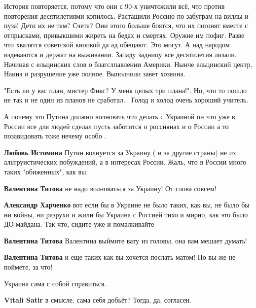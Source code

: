 \begin{itemize}
История повторяется, потому что они с 90-х уничтожили всё, что против
повторения десятилетиями копилось. Растащили Россию по забуграм на виллы и
пуза! Дети их не там? Счета? Они этого больше боятся, что их погонят вместе с
отпрысками, привыкшими жиреть на бедах и смертях. Оружие им пофиг. Разве что
хвалятся советской кнопкой да ад обещают. Это могут. А над народом издеваются и
держат на выживании. Западу задницу все десятилетия лизали. Начиная с
ельцинских слов о благслпавлении Америки. Нынче ельцинский центр, Наина и
разрушение уже полное. Выполнили завет хозяина.


"Есть ли у вас план, мистер Фикс?
У меня целых три плана!".
Но, что то пошло не так и не один из планов не сработал... Голод и холод очень хороший учитель.


А почему это Путина должно волновать что делать с Украиной он что уже в России
все для людей сделал пусть заботится о россиянах и о России а то позавидовать
тоже нечему особо .

\begin{itemize} %
\textbf{Любовь Истомина} Путин волнуется за Украину ( и за другие страны) не из альтруистических побуждений, а в интересах России. Жаль, что в России много таких "обиженных", как вы.

\textbf{Валентина Титова} не надо волноваться за Украину! От слова совсем!

\textbf{Александр Харченко} вот если бы в Украине не было таких, как вы, не было бы ни войны, ни разрухи и жили бы Украина с Россией тихо и мирно, как это было ДО майдана. Так что, сидите уже и помалкивайте

\textbf{Валентина Титова} Валентина выймите вату из головы, она вам мешает думать!

\textbf{Валентина Титова} и еще таких как вы хочется послать матом! Но вы же не поймете, за что!
\end{itemize} %

Украина сама с собой справиться.

\begin{itemize} %
\textbf{Vitali Satir} в смысле, сама себя добьёт? Тогда, да, согласен.
\end{itemize} %



\end{itemize}
